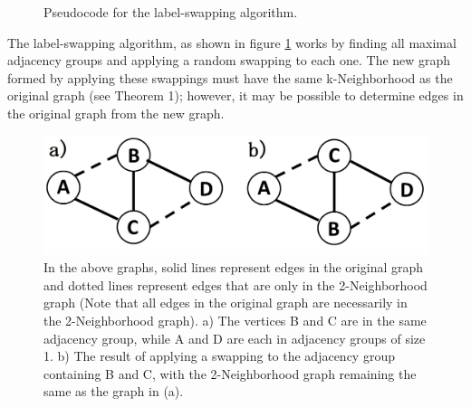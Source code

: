 \begin{figure}[H]
	\begin{algorithmic}
		\renewcommand{\algorithmicrequire}{\textbf{Input:}}
		\renewcommand{\algorithmicensure}{\textbf{Output:}}
		\EndFor
		\EndFor
		\EndFor
		\State {}
	\end{algorithmic}
	\caption{Pseudocode for the label-swapping algorithm.}
	\label{fig:label-swap}
\end{figure}

\indent The label-swapping algorithm, as shown in figure \ref{fig:label-swap} works by finding all maximal adjacency groups and applying a random swapping to each one. The new graph formed by applying these swappings must have the same k-Neighborhood as the original graph (see Theorem 1); however, it may be possible to determine edges in the original graph from the new graph.
\\

\begin{figure}[H]
  \centering
  \includegraphics[scale=0.3 ]{Sample-Graph.png}
  \caption{In the above graphs, solid lines represent edges in the original graph and dotted lines represent edges that are only in the 2-Neighborhood graph (Note that all edges in the original graph are necessarily in the 2-Neighborhood graph). a)  The vertices B and C are in the same adjacency group, while A and D are each in adjacency groups of size 1. b) The result of applying a swapping to the adjacency group containing B and C, with the 2-Neighborhood graph remaining the same as the graph in (a).}
  \label{fig:sample graph}
\end{figure}




